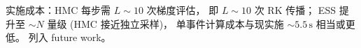 实施成本：HMC 每步需 $L\sim 10$ 次梯度评估，
即 $L\sim 10$ 次 RK 传播；
ESS 提升至 $\sim N$ 量级 (HMC 接近独立采样)，
单事件计算成本与现实施 $\sim 5.5\,\mathrm s$ 相当或更低。
列入 future work。

